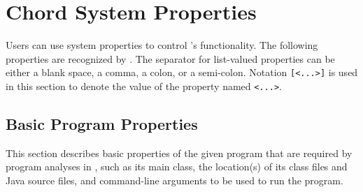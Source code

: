 
\section{Chord System Properties}
\label{sec:chord-sysprops}

Users can use system properties to control \Chord's functionality.
The following properties are recognized by \Chord.
The separator for list-valued properties can be either a blank space, a comma, a colon, or a semi-colon.
Notation {\tt [<...>]} is used in this section to denote the value of the property named {\tt <...>}.

\subsection{Basic Program Properties}

This section describes basic properties of the given program that are required by program analyses in \Chord,
such as its main class, the location(s) of its class files and Java source files, and command-line arguments
to be used to run the program.

